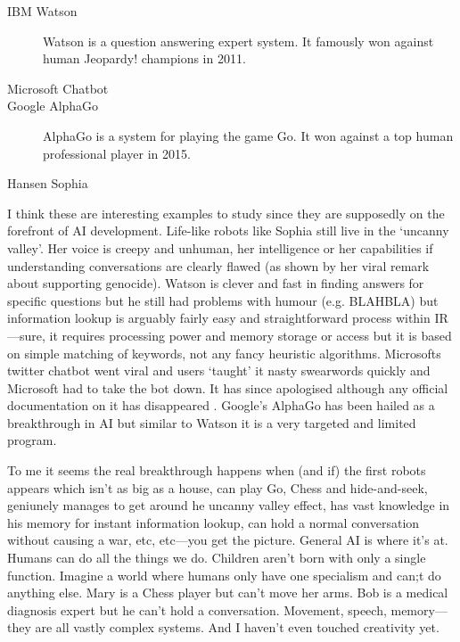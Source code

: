 \begin{description}
  \item[IBM Watson] Watson is a question answering expert system. It famously won against human Jeopardy! champions in 2011.
  \item[Microsoft Chatbot] 
  \item[Google AlphaGo] AlphaGo is a system for playing the game Go. It won against a top human professional player in 2015.
  \item[Hansen Sophia]
\end{description}

I think these are interesting examples to study since they are supposedly on the forefront of \ac{AI} development. Life-like robots like Sophia still live in the `uncanny valley'. Her voice is creepy and unhuman, her intelligence or her capabilities if understanding conversations are clearly flawed (as shown by her viral remark about supporting genocide). Watson is clever and fast in finding answers for specific questions but he still had problems with humour (e.g. BLAHBLA) but information lookup is arguably fairly easy and straightforward process within \ac{IR}---sure, it requires processing power and memory storage or access but it is based on simple matching of keywords, not any fancy heuristic algorithms. Microsofts twitter chatbot went viral and users `taught' it nasty swearwords  quickly and Microsoft had to take the bot down. It has since apologised although any official documentation on it has disappeared . Google's AlphaGo has been hailed as a breakthrough in \ac{AI} but similar to Watson it is a very targeted and limited program. 

To me it seems the real breakthrough happens when (and if) the first robots appears which isn't as big as a house, can play Go, Chess and hide-and-seek, geniunely manages to get around he uncanny valley effect, has vast knowledge in his memory for instant information lookup, can hold a normal conversation without causing a war, etc, etc---you get the picture. General \ac{AI} is where it's at. Humans can do all the things we do. Children aren't born with only a single function. Imagine a world where humans only have one specialism and can;t do anything else. Mary is a Chess player but can't move her arms. Bob is a medical diagnosis expert but he can't hold a conversation. Movement, speech, memory---they are all vastly complex systems. And I haven't even touched creativity yet.

